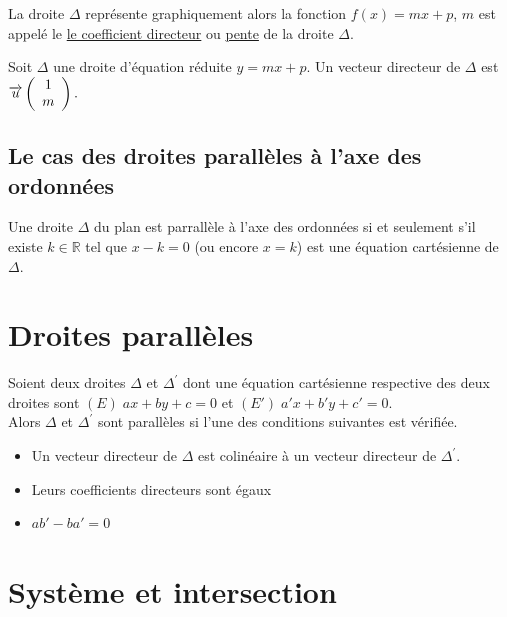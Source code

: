 \documentclass[french]{book}
\begin{document}
La droite $\Delta$ représente graphiquement alors la fonction $f(x)=mx+p$, $m$ est appelé le \underline{ le coefficient directeur} ou \underline{pente} de la droite $\Delta$.

\begin{prop}
Soit $\Delta$ une droite d'équation réduite $y=mx+p$. Un vecteur directeur de $\Delta$ est $\overrightarrow{u} \left( \begin{array}{c}
1 \\
m \\
\end{array} \right). \\ 
$
\end{prop}

\subsection*{Le cas des droites parallèles à l'axe des ordonnées}
\begin{prop}
Une droite $\Delta$ du plan est parrallèle à l'axe des ordonnées si et seulement s'il existe $k \in \mathbb{R}$ tel que $x-k=0$ (ou encore $x=k$) est une équation cartésienne de $\Delta$. 
\end{prop}

\section{Droites parallèles}
\begin{prop}
Soient deux droites $\Delta$ et $\Delta^{'}$ dont une équation cartésienne respective des deux droites sont $(E)\; ax+by+c=0$ et $(E')\; a'x+b'y+c'=0$. \\

Alors $\Delta$ et $\Delta^{'}$ sont parallèles si l'une des conditions suivantes est vérifiée.

\begin{itemize}
\item Un vecteur directeur de $\Delta$ est colinéaire à un vecteur directeur de $\Delta^{'}$.
\item Leurs coefficients directeurs sont égaux
\item $ab'-ba'=0$
\end{itemize}

\end{prop}

\section{Système et intersection}
\end{document}
